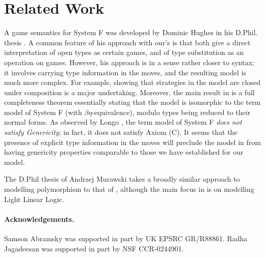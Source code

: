 \documentclass[a4paper,11pt]{article}
\begin{document}
\section{Related Work}
A game semantics for System F was developed by Dominic Hughes in his D.Phil. thesis
\cite{Hug99}. A common feature of his approach with
our's is that both give a direct interpretation of open types as certain games,
and of type substitution as an operation on games. However, his approach is in a sense rather closer to syntax; it
involves carrying type information in the moves, and the resulting model
is much more complex. For example, showing that strategies in the
model are closed under composition is a major undertaking. Moreover,
the main result in \cite{Hug99} is a full completeness theorem
essentially stating that the model is isomorphic to the term model of
System F (with $\beta\eta$-equivalence), modulo types being reduced to
their normal forms. As observed by Longo \cite{Lon95}, the term model
of System F \emph{does not satisfy Genericity}; in fact, it does not
satisfy Axiom (C). It seems that the presence of explicit type
information in the moves will preclude the model in \cite{Hug99} from
having  genericity properties comparable to those we have established for
our model.

The D.Phil thesis of Andrzej Murawski \cite{Mur01} takes a broadly similar approach
to modelling polymorphism to that of \cite{Hug99}, although the main
focus in \cite{Mur01} is on modelling Light Linear Logic.

\paragraph{Acknowledgements.}  Samson Abramsky was supported in part
by UK EPSRC GR/R88861. Radha Jagadeesan was supported in part by NSF
CCR-0244901.
\end{document}
